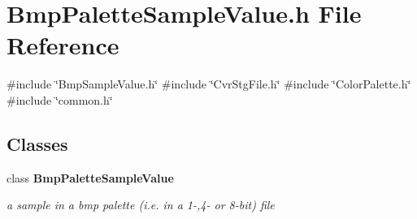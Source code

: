 \section{Bmp\+Palette\+Sample\+Value.\+h File Reference}
\label{BmpPaletteSampleValue_8h}
{\ttfamily \#include \char`\"{}Bmp\+Sample\+Value.\+h\char`\"{}}\newline
{\ttfamily \#include \char`\"{}Cvr\+Stg\+File.\+h\char`\"{}}\newline
{\ttfamily \#include \char`\"{}Color\+Palette.\+h\char`\"{}}\newline
{\ttfamily \#include \char`\"{}common.\+h\char`\"{}}\newline
\subsection*{Classes}
\begin{DoxyCompactItemize}
\item 
class \textbf{ Bmp\+Palette\+Sample\+Value}
\begin{DoxyCompactList}\small\item\em a sample in a bmp palette (i.\+e. in a 1-\/,4-\/ or 8-\/bit) file \end{DoxyCompactList}\end{DoxyCompactItemize}
